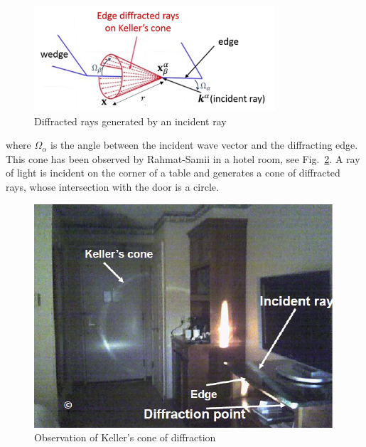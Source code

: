 \begin{figure}
    \centering
    \includegraphics[width=0.8\textwidth]{images/chapter1/KellerCone.png}
    \caption{Diffracted rays generated by an incident ray}
    \label{KellerCone}
\end{figure}
where $\Omega_{\alpha}$ is the angle between the incident wave vector and the diffracting edge. This cone has been observed by Rahmat-Samii \cite{ConePhoto} in a hotel room, see Fig.~\ref{PhotoCone}. A ray of light is incident on the corner of a table and generates a cone of diffracted rays, whose intersection with the door is a circle.

\begin{figure}
    \centering
    \includegraphics{images/chapter1/HotelCone.png}
    \caption{Observation of Keller's cone of diffraction}
    \label{PhotoCone}
\end{figure}

